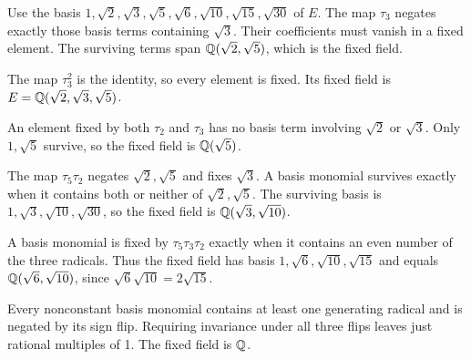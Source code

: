 Use the basis $1,\sqrt2,\sqrt3,\sqrt5,\sqrt6,\sqrt{10},\sqrt{15},\sqrt{30}$ of $E$. The map $\tau_3$ negates exactly those basis terms containing $\sqrt3$. Their coefficients must vanish in a fixed element. The surviving terms span $\mathbb{Q}(\sqrt2,\sqrt5)$, which is the fixed field.

The map $\tau_3^2$ is the identity, so every element is fixed. Its fixed field is $E=\mathbb{Q}(\sqrt2,\sqrt3,\sqrt5)$.

An element fixed by both $\tau_2$ and $\tau_3$ has no basis term involving $\sqrt2$ or $\sqrt3$. Only $1,\sqrt5$ survive, so the fixed field is $\mathbb{Q}(\sqrt5)$.

The map $\tau_5\tau_2$ negates $\sqrt2,\sqrt5$ and fixes $\sqrt3$. A basis monomial survives exactly when it contains both or neither of $\sqrt2,\sqrt5$. The surviving basis is $1,\sqrt3,\sqrt{10},\sqrt{30}$, so the fixed field is $\mathbb{Q}(\sqrt3,\sqrt{10})$.

A basis monomial is fixed by $\tau_5\tau_3\tau_2$ exactly when it contains an even number of the three radicals. Thus the fixed field has basis $1,\sqrt6,\sqrt{10},\sqrt{15}$ and equals $\mathbb{Q}(\sqrt6,\sqrt{10})$, since $\sqrt6\sqrt{10}=2\sqrt{15}$.

Every nonconstant basis monomial contains at least one generating radical and is negated by its sign flip. Requiring invariance under all three flips leaves just rational multiples of 1. The fixed field is $\mathbb{Q}$.

